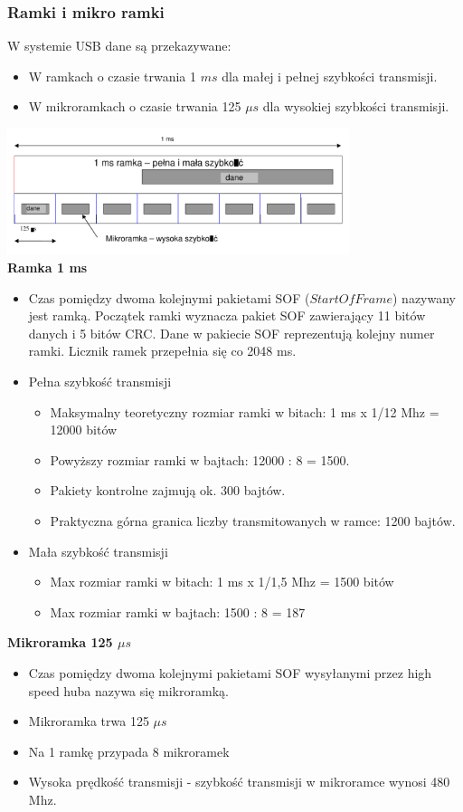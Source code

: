 		\subsubsection{Ramki i mikro ramki}
			W systemie USB dane są przekazywane:
			\begin{itemize}
				\item W ramkach o czasie trwania 1 $ms$ dla małej i pełnej szybkości transmisji.
				\item W mikroramkach o czasie trwania 125 $\mu s$ dla wysokiej szybkości transmisji.
			\end{itemize}
			\includegraphics[width=10cm]{./wyklady/USB_11_1.pdf}\\
			\textbf{Ramka 1 ms}
			\begin{itemize}
				\item Czas pomiędzy dwoma kolejnymi pakietami SOF ($Start Of Frame$) nazywany jest ramką. Początek ramki wyznacza pakiet SOF zawierający 11 bitów danych i 5 bitów CRC. Dane w pakiecie SOF reprezentują kolejny numer ramki. Licznik ramek przepełnia się co 2048 ms.
				\item Pełna szybkość transmisji
				\begin{itemize}
					\item Maksymalny teoretyczny rozmiar ramki w bitach: 1 ms x 1/12 Mhz = 12000 bitów
					\item Powyższy rozmiar ramki w bajtach: 12000 : 8 = 1500.
					\item Pakiety kontrolne zajmują ok. 300 bajtów.
					\item Praktyczna górna granica liczby transmitowanych w ramce: 1200 bajtów.
				\end{itemize}
				\item Mała szybkość transmisji
				\begin{itemize}
					\item Max rozmiar ramki w bitach: 1 ms x 1/1,5 Mhz = 1500 bitów
					\item Max rozmiar ramki w bajtach: 1500 : 8 = 187
				\end{itemize}
			\end{itemize}
			\textbf{Mikroramka 125 $\mu s$}
			\begin{itemize}
				\item Czas pomiędzy dwoma kolejnymi pakietami SOF wysyłanymi przez high speed huba nazywa się mikroramką.
				\item Mikroramka trwa 125 $\mu s$
				\item Na 1 ramkę przypada 8 mikroramek
				\item Wysoka prędkość transmisji - szybkość transmisji w mikroramce wynosi 480 Mhz.
			\end{itemize}
			
